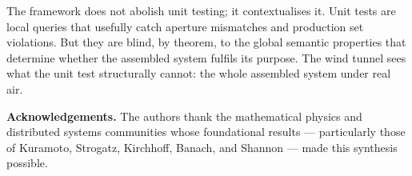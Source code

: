 \documentclass[twocolumn,a4paper,11pt]{article}
\theoremstyle{plain}
\theoremstyle{definition}
\theoremstyle{remark}
\begin{document}
The framework does not abolish unit testing; it contextualises it. Unit
tests are local queries that usefully catch aperture mismatches and
production set violations. But they are blind, by theorem, to the global
semantic properties that determine whether the assembled system fulfils
its purpose. The wind tunnel sees what the unit test structurally cannot:
the whole assembled system under real air.

\bigskip

\noindent\textbf{Acknowledgements.} The authors thank the mathematical
physics and distributed systems communities whose foundational results ---
particularly those of Kuramoto, Strogatz, Kirchhoff, Banach, and Shannon
--- made this synthesis possible.



\end{document}
